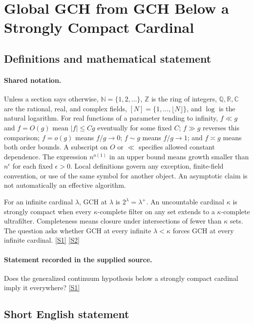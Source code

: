 \documentclass[11pt,a4paper]{article}
\newcommand{\N}{\mathbb{N}}
\newcommand{\Z}{\mathbb{Z}}
\newcommand{\Q}{\mathbb{Q}}
\newcommand{\R}{\mathbb{R}}
\newcommand{\C}{\mathbb{C}}
\newcommand{\sref}[2]{\hyperlink{source:#1:#2}{[S#2]}}
\begin{document}
\section{Global GCH from GCH Below a Strongly Compact Cardinal}\label{statement}


\subsection{Definitions and mathematical statement}

\paragraph{Shared notation.}Unless a section says otherwise, $\N=\{1,2,\ldots\}$,
$\Z$ is the ring of integers, $\Q,\R,\C$ are the rational, real, and complex
fields, $[N]=\{1,\ldots,\lfloor N\rfloor\}$, and $\log$ is the natural
logarithm. For real functions of a parameter tending to infinity,
$f\ll g$ and $f=O(g)$ mean $|f|\leq Cg$ eventually for some fixed $C$;
$f\gg g$ reverses this comparison; $f=o(g)$ means $f/g\to0$;
$f\sim g$ means $f/g\to1$; and $f\asymp g$ means both order bounds.
A subscript on $O$ or $\ll$ specifies allowed constant dependence.
The expression $n^{o(1)}$ in an upper bound means growth smaller than
$n^\epsilon$ for each fixed $\epsilon>0$. Local definitions govern any
exception, finite-field convention, or use of the same symbol for another
object. An asymptotic claim is not automatically an effective algorithm.



For an infinite cardinal $\lambda$, GCH at $\lambda$ is $2^\lambda=\lambda^+$. An uncountable cardinal $\kappa$ is strongly compact when every $\kappa$-complete filter on any set extends to a $\kappa$-complete ultrafilter. Completeness means closure under intersections of fewer than $\kappa$ sets. The question asks whether GCH at every infinite $\lambda<\kappa$ forces GCH at every infinite cardinal. \sref{statement}{1} \sref{statement}{2}

\paragraph{Statement recorded in the supplied source.}
Does the generalized continuum hypothesis below a strongly compact cardinal imply it everywhere? \sref{statement}{1}

\subsection{Short English statement}
\end{document}
